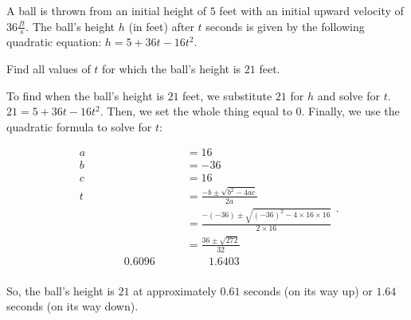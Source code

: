 
A ball is thrown from an initial height of $5$ feet with an initial upward
velocity of $36 \frac{ft}{s}$. The ball's height $h$ (in feet) after $t$ seconds
is given by the following quadratic equation: $h = 5 + 36t - 16t^{2}$.

Find all values of $t$ for which the ball's height is $21$ feet.

To find when the ball's height is $21$ feet, we substitute $21$ for $h$ and
solve for $t$. $21 = 5 + 36t - 16t^{2}$. Then, we set the whole thing equal to
$0$. Finally, we use the quadratic formula to solve for $t$:

\begin{equation}
  \label{eqt:solve_for_t}
  \begin{split}
    a &= 16 \\
    b &= -36 \\
    c &= 16 \\
    t &= \frac{-b \pm \sqrt{b^{2} - 4ac}}{2a} \\
      &= \frac{-(-36) \pm \sqrt{(-36)^{2} - 4 \times 16 \times 16}}{2 \times 16} \\
      &= \frac{36 \pm \sqrt{272}}{32} \\
      \qquad\qquad 0.6096 \qquad&\qquad 1.6403 \\
  \end{split}
.\end{equation}

So, the ball's height is $21$ at approximately $0.61$ seconds (on its way up) or
$1.64$ seconds (on its way down).

\newpage
